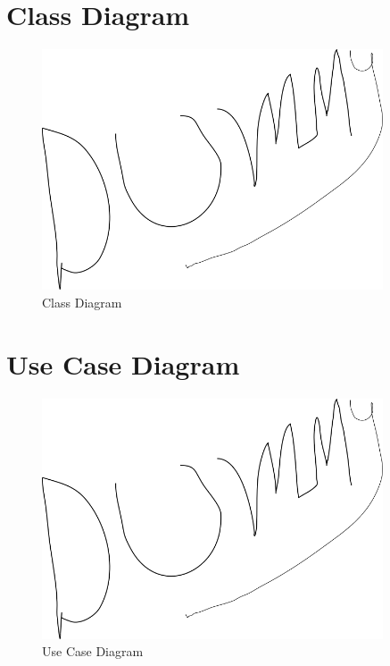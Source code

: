 \section{Class Diagram}
\begin{figure}[h]
    \centering
    \includegraphics[width=0.9\textwidth]{images/dummy.png}
    \caption{Class Diagram}
    \label{fig:Class Diagram}
\end{figure}

\clearpage
\section{Use Case Diagram}
\begin{figure}[h]
    \centering
    \includegraphics[width=0.9\textwidth]{images/dummy.png}
    \caption{Use Case Diagram}
    \label{fig:Use Case Diagram}
\end{figure}

\clearpage

